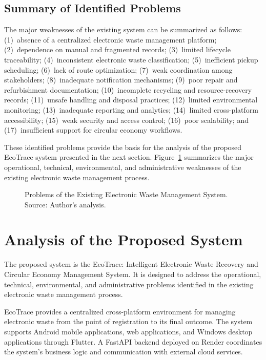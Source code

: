 \subsection{Summary of Identified Problems}
The major weaknesses of the existing system can be summarized as follows:
(1)~absence of a centralized electronic waste management platform;
(2)~dependence on manual and fragmented records; (3)~limited lifecycle
traceability; (4)~inconsistent electronic waste classification; (5)~inefficient
pickup scheduling; (6)~lack of route optimization; (7)~weak coordination among
stakeholders; (8)~inadequate notification mechanisms; (9)~poor repair and
refurbishment documentation; (10)~incomplete recycling and resource-recovery
records; (11)~unsafe handling and disposal practices; (12)~limited environmental
monitoring; (13)~inadequate reporting and analytics; (14)~limited cross-platform
accessibility; (15)~weak security and access control; (16)~poor scalability; and
(17)~insufficient support for circular economy workflows.

These identified problems provide the basis for the analysis of the proposed
EcoTrace system presented in the next section. Figure~\ref{fig:existing-problems}
summarizes the major operational, technical, environmental, and administrative
weaknesses of the existing electronic waste management process.

\begin{figure}[H]
  \centering
  \caption{Problems of the Existing Electronic Waste Management System. Source: Author's analysis.}
  \label{fig:existing-problems}
\end{figure}

\section{Analysis of the Proposed System}

The proposed system is the EcoTrace: Intelligent Electronic Waste Recovery and
Circular Economy Management System. It is designed to address the
operational, technical, environmental, and administrative problems identified in
the existing electronic waste management process.

EcoTrace provides a centralized cross-platform environment for managing
electronic waste from the point of registration to its final outcome. The system
supports Android mobile applications, web applications, and Windows desktop
applications through Flutter. A FastAPI backend deployed on Render coordinates the
system's business logic and communication with external cloud services.

